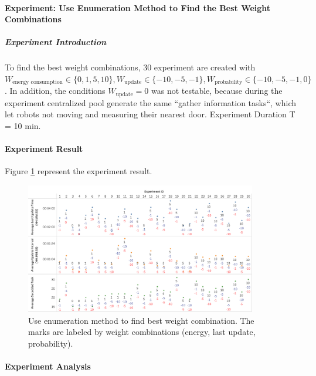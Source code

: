 \paragraph{Experiment: Use Enumeration Method to Find the Best Weight Combinations}
\label{sec:gather_info_experiment_enumerate}
\subparagraph{Experiment Introduction} 
To find the best weight combinations, 30 experiment are created with $W_{\mbox{energy consumption}} \in \{ 0,1,5,10 \}, W_{\mbox{update}} \in \{-10,-5,-1\}, W_{\mbox{probability}} \in \{-10,-5,-1,0\}$. In addition, the conditions $W_{\mbox{update}}=0$ was not testable, because during the experiment centralized pool generate the same ``gather information tasks``, which let robots not moving and measuring their nearest door. Experiment Duration T = 10 min.

\paragraph{Experiment Result} 
Figure \ref{fig:gather_info_experiment_enumerate} represent the experiment result.

\begin{figure}
 \centering
 \includegraphics[width = 0.9\textwidth]{content/images/ch5/gather_info_enumerate.png}
 \caption{Use enumeration method to find best weight combination. The marks are labeled by weight combinations (energy, last update, probability).}
 \label{fig:gather_info_experiment_enumerate}
\end{figure}

\paragraph{Experiment Analysis} 


